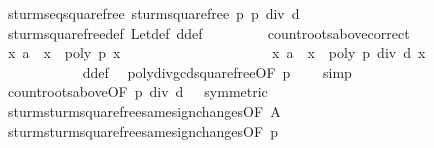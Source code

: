 \begin{isabellebody}
\ sturm{\isacharunderscore}seq{\isacharunderscore}squarefree\ {\isachardoublequoteopen}sturm{\isacharunderscore}squarefree{\isacharprime}\ p{\isachardoublequoteclose}\ {\isachardoublequoteopen}p\ div\ d{\isachardoublequoteclose}\isanewline
\ \ \ \ \ \ \ \ \ \ \isamarkupfalse%
\ sturm{\isacharunderscore}squarefree{\isacharprime}{\isacharunderscore}def\ Let{\isacharunderscore}def\ d{\isacharunderscore}def\ \isacommand{{\isachardot}}\isamarkupfalse%
\isanewline
\ \ \ \ \ \ \isamarkupfalse%
\ count{\isacharunderscore}roots{\isacharunderscore}above{\isacharunderscore}correct\isanewline
\ \ \ \ \ \ \isamarkupfalse%
\ \isamarkupfalse%
\ {\isachardoublequoteopen}{\isacharbraceleft}x{\isachardot}\ a\ {\isacharless}\ x\ {\isasymand}\ poly\ p\ x\ {\isacharequal}\ {}{\isacharbraceright}\ {\isacharequal}\ \isanewline
\ \ \ \ \ \ \ \ \ \ \ \ \ \ \ \ \ {\isacharbraceleft}x{\isachardot}\ a\ {\isacharless}\ x\ {\isasymand}\ poly\ {\isacharparenleft}p\ div\ d{\isacharparenright}\ x\ {\isacharequal}\ {}{\isacharbraceright}{\isachardoublequoteclose}\isanewline
\ \ \ \ \ \ \ \ \ \ \isamarkupfalse%
\ d{\isacharunderscore}def\ \isamarkupfalse%
\ poly{\isacharunderscore}div{\isacharunderscore}gcd{\isacharunderscore}squarefree{\isacharparenleft}{}{\isacharparenright}{\isacharbrackleft}OF\ {\isacharbackquoteopen}p\ {\isasymnoteq}\ {}{\isacharbackquoteclose}{\isacharbrackright}\ \isamarkupfalse%
\ simp\isanewline
\ \ \ \ \ \ \isamarkupfalse%
\ \isamarkupfalse%
\ count{\isacharunderscore}roots{\isacharunderscore}above{\isacharbrackleft}OF\ {\isacharbackquoteopen}p\ div\ d\ {\isasymnoteq}\ {}{\isacharbackquoteclose}{\isacharcomma}\ symmetric{\isacharbrackright}\isanewline
\ \ \ \ \ \ \isamarkupfalse%
\ \isamarkupfalse%
\ sturm{\isacharunderscore}sturm{\isacharunderscore}squarefree{\isacharprime}{\isacharunderscore}same{\isacharunderscore}sign{\isacharunderscore}changes{\isacharparenleft}{}{\isacharparenright}{\isacharbrackleft}OF\ A{\isacharbrackright}\isanewline
\ \ \ \ \ \ \isamarkupfalse%
\ \isamarkupfalse%
\ sturm{\isacharunderscore}sturm{\isacharunderscore}squarefree{\isacharprime}{\isacharunderscore}same{\isacharunderscore}sign{\isacharunderscore}changes{\isacharparenleft}{}{\isacharparenright}{\isacharbrackleft}OF\ {\isacharbackquoteopen}p\ {\isasymnoteq}\ {}{\isacharbackquoteclose}{\isacharbrackright}\isanewline

\end{isabellebody}

